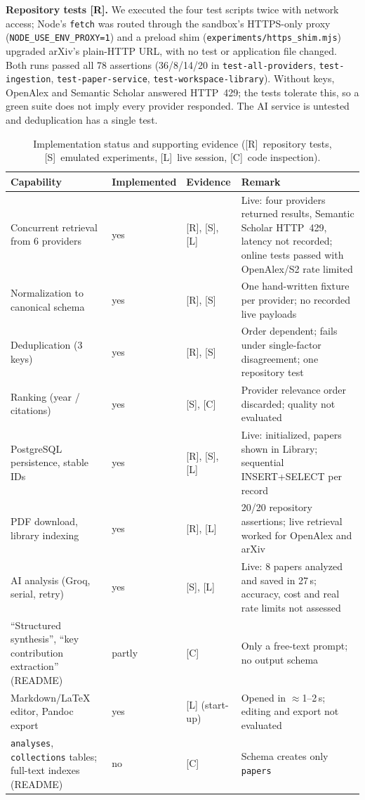 \documentclass[conference]{IEEEtran}
\newcommand{\code}[1]{\texttt{\small #1}}
\begin{document}
\textbf{Repository tests [R].} We executed the four test scripts twice with network access; Node's \code{fetch} was routed through the sandbox's HTTPS-only proxy (\code{NODE\_USE\_ENV\_PROXY=1}) and a preload shim (\code{experiments/https\_shim.mjs}) upgraded arXiv's plain-HTTP URL, with no test or application file changed. Both runs passed all 78 assertions (36/8/14/20 in \code{test-all-providers}, \code{test-ingestion}, \code{test-paper-service}, \code{test-workspace-library}). Without keys, OpenAlex and Semantic Scholar answered HTTP~429; the tests tolerate this, so a green suite does not imply every provider responded. The AI service is untested and deduplication has a single test.

\begin{table}[t]
\centering
\caption{Implementation status and supporting evidence ([R]~repository tests, [S]~emulated experiments, [L]~live session, [C]~code inspection).}
\label{tab:status}
\footnotesize
\begin{tabular}{@{}L{4.1cm} L{1.3cm} L{1.5cm} L{8.8cm}@{}}
\toprule
Capability & Implemented & Evidence & Remark \\
\midrule
Concurrent retrieval from 6 providers & yes & [R], [S], [L] & Live: four providers returned results, Semantic Scholar HTTP~429, latency not recorded; online tests passed with OpenAlex/S2 rate limited \\
Normalization to canonical schema & yes & [R], [S] & One hand-written fixture per provider; no recorded live payloads \\
Deduplication (3 keys) & yes & [R], [S] & Order dependent; fails under single-factor disagreement; one repository test \\
Ranking (year / citations) & yes & [S], [C] & Provider relevance order discarded; quality not evaluated \\
PostgreSQL persistence, stable IDs & yes & [R], [S], [L] & Live: initialized, papers shown in Library; sequential INSERT+SELECT per record \\
PDF download, library indexing & yes & [R], [L] & 20/20 repository assertions; live retrieval worked for OpenAlex and arXiv \\
AI analysis (Groq, serial, retry) & yes & [S], [L] & Live: 8 papers analyzed and saved in 27\,s; accuracy, cost and real rate limits not assessed \\
``Structured synthesis'', ``key contribution extraction'' (README) & partly & [C] & Only a free-text prompt; no output schema \\
Markdown/\LaTeX{} editor, Pandoc export & yes & [L] (start-up) & Opened in $\approx$1--2\,s; editing and export not evaluated \\
\texttt{analyses}, \texttt{collections} tables; full-text indexes (README) & no & [C] & Schema creates only \code{papers} \\
\bottomrule
\end{tabular}
\end{table}
\end{document}
